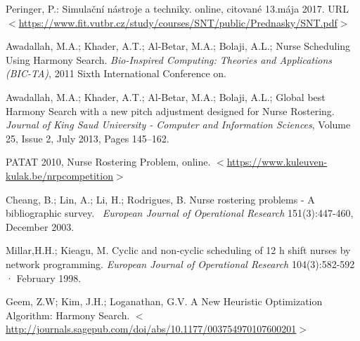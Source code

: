 \documentclass[a4paper, 14pt]{article}
\begin{document}
\newpage
\begin{thebibliography}{9}
 	Peringer, P.: Simulační nástroje a techniky. online, citované 13.mája 2017. URL
	 \href{https://www.fit.vutbr.cz/study/courses/SNT/public/Prednasky/SNT.pdf}{$<$https://www.fit.vutbr.cz/study/courses/SNT/public/Prednasky/SNT.pdf$>$}
	
 	Awadallah, M.A.; Khader, A.T.; Al-Betar, M.A.; Bolaji, A.L.; Nurse Scheduling Using Harmony Search. \emph{Bio-Inspired Computing: Theories and Applications (BIC-TA)}, 2011 Sixth International Conference on.

 	Awadallah, M.A.; Khader, A.T.;  Al-Betar, M.A.; Bolaji, A.L.; Global best Harmony Search with a new pitch adjustment designed for Nurse Rostering. \emph{Journal of King Saud University - Computer and Information Sciences}, Volume 25, Issue 2, July 2013, Pages 145–162.
	 
 	PATAT 2010, Nurse Rostering Problem, online.
	 \href{https://www.kuleuven-kulak.be/nrpcompetition}{$<$https://www.kuleuven-kulak.be/nrpcompetition$>$}

 	Cheang, B.; Lin, A.; Li, H.; Rodrigues, B. Nurse rostering problems - A bibliographic survey. \emph{ European Journal of Operational Research} 151(3):447-460, December 2003.  

 	Millar,H.H.; Kieagu, M. Cyclic and non-cyclic scheduling of 12 h shift nurses by network programming. \emph{European Journal of Operational Research} 104(3):582-592 · February 1998.

 	Geem, Z.W; Kim, J.H.; Loganathan, G.V. A New Heuristic Optimization Algorithm: Harmony Search.
	 \href{http://journals.sagepub.com/doi/abs/10.1177/003754970107600201}{$<$http://journals.sagepub.com/doi/abs/10.1177/003754970107600201$>$}
 	

\end{thebibliography}
\end{document}
